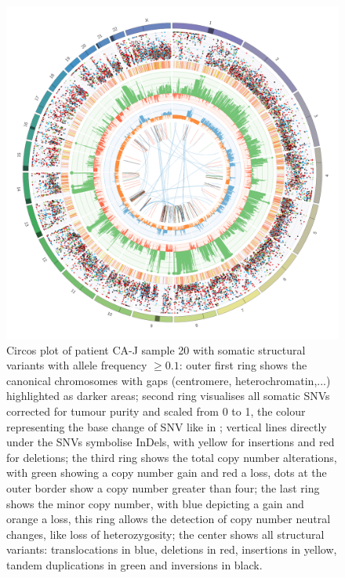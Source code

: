 \begin{figure}[htp]
\centering
\includegraphics[width=.99\linewidth]{Figures/CASCADE/CA80/CA80-20.circos.png}
\caption[Circos plot of patient CA-J sample 20]{Circos plot of patient CA-J sample 20 with somatic structural variants with allele frequency $\geq 0.1$: outer first ring shows the canonical chromosomes with gaps (centromere, heterochromatin,...) highlighted as darker areas; second ring visualises all somatic SNVs corrected for tumour purity and scaled from 0 to 1, the colour representing the base change of SNV like in \protect\textcite{Alexandrov2013}; vertical lines directly under the SNVs symbolise InDels, with yellow for insertions and red for deletions; the third ring shows the total copy number alterations, with green showing a copy number gain and red a loss, dots at the outer border show a copy number greater than four; the last ring shows the minor copy number, with blue depicting a gain and orange a loss, this ring allows the detection of copy number neutral changes, like loss of heterozygosity; the center shows all structural variants: translocations in blue, deletions in red, insertions in yellow, tandem duplications in green and inversions in black.} \label{fig:ca80.20circos}
\end{figure}


